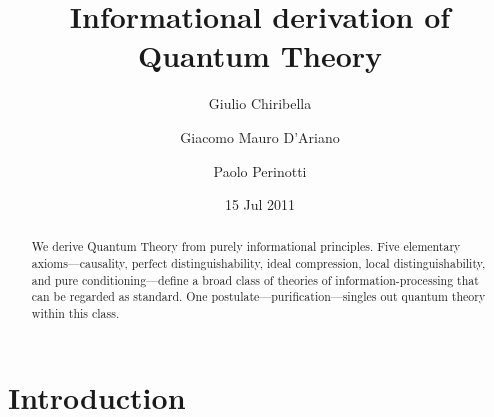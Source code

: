 \documentclass[12pt,aps,pra,showpacs,groupedaddress]{revtex4-1}
\begin{document}
\title{Informational derivation of Quantum Theory}

\author{Giulio Chiribella} 
\author{Giacomo Mauro D'Ariano}
\author{Paolo Perinotti} 
\date{15 Jul 2011}

\begin{abstract} We derive Quantum Theory from purely informational principles.  Five elementary
  axioms---causality, perfect distinguishability, ideal compression, local distinguishability, and
  pure conditioning---define a broad class of theories of information-processing that can be
  regarded as standard. One postulate---purification---singles out quantum theory within this class.
\end{abstract}
\maketitle


\tableofcontents
\newpage

\section{Introduction}
\end{document}
